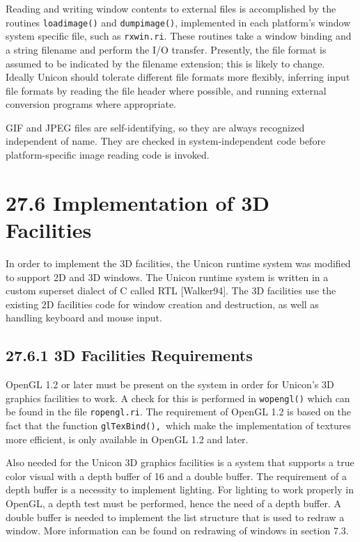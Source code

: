 Reading and writing window contents to external files is accomplished
by the routines \texttt{loadimage()} and \texttt{dumpimage()},
implemented in each platform's window system specific file, such as
\texttt{rxwin.ri}. These routines take a window binding and a string
filename and perform the I/O transfer. Presently, the file format is
assumed to be indicated by the filename extension; this is likely to
change. Ideally Unicon should tolerate different file formats more
flexibly, inferring input file formats by reading the file header
where possible, and running external conversion programs where
appropriate.

GIF and JPEG files are self-identifying, so they are always recognized
independent of name. They are checked in system-independent code
before platform-specific image reading code is invoked.


\section[27.6 Implementation of 3D Facilities]{27.6 Implementation of 3D Facilities}

In order to implement the 3D facilities, the Unicon runtime system was
modified to support 2D and 3D windows. The Unicon runtime system is
written in a custom superset dialect of C called RTL [Walker94]. The
3D facilities use the existing 2D facilities code for window creation
and destruction, as well as handling keyboard and mouse input.

\subsection[27.6.1 3D Facilities Requirements]{27.6.1 3D Facilities Requirements}

OpenGL 1.2 or later must be present on the system in order for
Unicon's 3D graphics facilities to work. A check for this is performed
in \texttt{wopengl()} which can be found in the file
\texttt{ropengl.ri}. The requirement of OpenGL 1.2 is based on the
fact that the function \texttt{glTexBind(),}\texttt{ }which make the
implementation of textures more efficient, is only available in OpenGL
1.2 and later.

Also needed for the Unicon 3D graphics facilities is a system that
supports a true color visual with a depth buffer of 16 and a double
buffer. The requirement of a depth buffer is a necessity to implement
lighting. For lighting to work properly in OpenGL, a depth test must
be performed, hence the need of a depth buffer. A double buffer is
needed to implement the list structure that is used to redraw a
window. More information can be found on redrawing of windows in
section 7.3.

